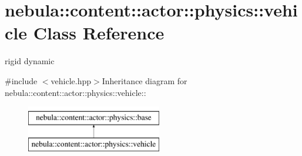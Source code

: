 \hypertarget{classnebula_1_1content_1_1actor_1_1physics_1_1vehicle}{
\section{nebula::content::actor::physics::vehicle Class Reference}
\label{classnebula_1_1content_1_1actor_1_1physics_1_1vehicle}
}


rigid dynamic  


{\ttfamily \#include $<$vehicle.hpp$>$}Inheritance diagram for nebula::content::actor::physics::vehicle::\begin{figure}[H]
\begin{center}
\leavevmode
\includegraphics[height=2cm]{classnebula_1_1content_1_1actor_1_1physics_1_1vehicle}
\end{center}
\end{figure}
